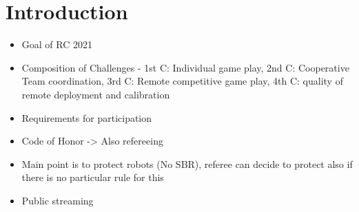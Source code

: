 \section{Introduction}

\begin{itemize}
    \item Goal of RC 2021
    \item Composition of Challenges - 1st C: Individual game play, 2nd C: Cooperative Team coordination, 3rd C: Remote competitive game play, 4th C: quality of remote deployment and calibration 
    \item Requirements for participation
    \item Code of Honor -> Also refereeing
    \item Main point is to protect robots (No SBR), referee can decide to protect also if there is no particular rule for this
    \item Public streaming
\end{itemize}